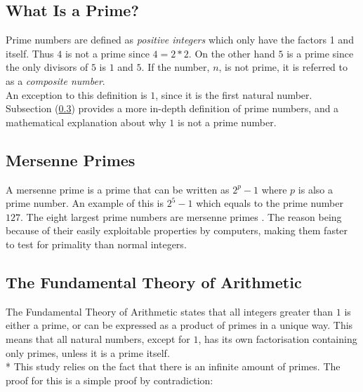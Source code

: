 \documentclass[main.tex]{subfiles}
\begin{document}
\subsection{What Is a Prime?}
Prime numbers are defined as \textit{positive integers} which only have the
factors 1 and itself. Thus $4$ is not a prime since $4 = 2 * 2$. On the other
hand $5$ is a prime since the only divisors of $5$ is $1$ and $5$. If the
number, $n$, is not prime, it is referred to as a \textit{composite number}. \\

An exception to this definition is $1$, since it is the first natural number.
Subsection (\ref{arithmetic}) provides a more in-depth definition of prime
numbers, and a mathematical explanation about why $1$ is not a prime number.

\subsection{Mersenne Primes}
A mersenne prime is a prime that can be written as $2^{p}-1$ where $p$ is also a
prime number. An example of this is $2^5-1$ which equals to the prime number
$127$. The eight largest prime numbers are mersenne primes
\cite{prime:largest_digits}. The reason being because of their easily
exploitable properties by computers, making them faster to test for primality
than normal integers.

\subsection{The Fundamental Theory of Arithmetic} \label{arithmetic} The
Fundamental Theory of Arithmetic \cite{theorem:arithmetic} states that all
integers greater than $1$ is either a prime, or can be expressed as a product of
primes in a unique way. This means that all natural numbers, except for $1$, has
its own factorisation containing only primes, unless it is a prime itself.
\newline
\\*
This study relies on the fact that there is an infinite amount of primes. The
proof for this is a simple proof by contradiction: \\
\end{document}

